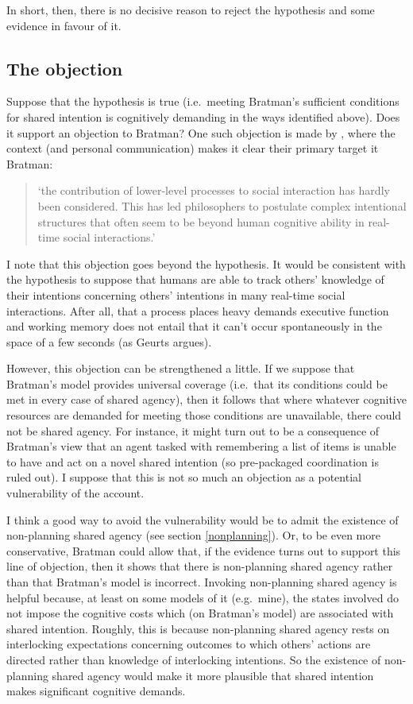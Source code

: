 \documentclass[12pt,letterpaper]{extarticle}
\begin{document}
In short, then, there is no decisive reason to reject the hypothesis and  some evidence in favour of it.


\subsection{The objection}
Suppose that the hypothesis is true (i.e.\ meeting Bratman's sufficient conditions for shared intention is cognitively demanding in the ways identified above).
Does it support an objection to Bratman?
One such objection is made by \citet[p.\ 2022]{Knoblich:2008hy}, where the context (and personal communication) makes it clear their primary target it Bratman: 
%
\begin{quote}
`the contribution of lower-level processes to social interaction has hardly been considered. This has led philosophers to postulate complex intentional structures that often seem to be beyond human cognitive ability in real-time social interactions.'
\end{quote} 
%
I note that this objection goes beyond the hypothesis.
It would be consistent with the hypothesis to suppose that humans are able to track others' knowledge of their intentions concerning others' intentions in many real-time social interactions.
After all, that a process places heavy demands executive function and working memory does not entail that it can't occur spontaneously in the space of a few seconds (as Geurts argues).

However, this objection can be strengthened a little.
If we suppose that Bratman's model provides universal coverage (i.e.\ that its conditions could be met in every case of shared agency), then it follows that where whatever cognitive resources are demanded for meeting those conditions are unavailable, there could not be shared agency.
For instance, it might turn out to be a consequence of Bratman's view that an agent tasked with remembering a list of items is unable to have and act on a novel shared intention (so pre-packaged coordination is ruled out).
I suppose that this is not so much an objection as a potential vulnerability of the account.

I think a good way to avoid the vulnerability would be to admit the existence of non-planning shared agency (see section \vref{nonplanning}).
Or, to be even more conservative, Bratman could allow that, if the evidence turns out to support this line of objection, then it shows that there is non-planning shared agency rather than that Bratman's model is incorrect.
Invoking non-planning shared agency is helpful because, at least on some models of it (e.g.\ mine), the states involved do not impose the cognitive costs which (on Bratman's model) are associated with shared intention.
Roughly, this is because non-planning shared agency rests on interlocking expectations concerning outcomes to which others' actions are directed rather than knowledge of interlocking intentions.
So the existence of non-planning shared agency would make it more plausible that shared intention makes significant cognitive demands.
\end{document}
